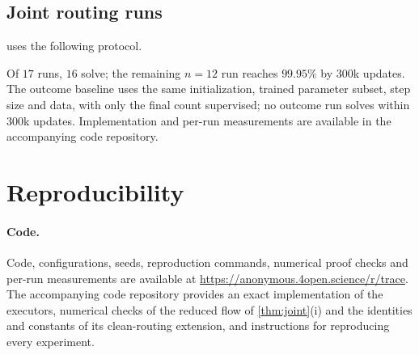 \subsection{Joint routing runs}
\label{app:reach}

 uses the following protocol.
\begin{center}\small
{}
\end{center}
Of $17$ runs, $16$ solve; the remaining $n=12$ run reaches $99.95\%$ by $300$k updates. The outcome baseline uses the same
initialization, trained parameter subset, step size and data, with only the final count supervised; no outcome run
solves within $300$k updates. Implementation and per-run measurements are available in the accompanying code repository.

\section{Reproducibility}
\label{app:reproducibility}

\paragraph{Code.} Code, configurations, seeds, reproduction commands, numerical proof checks and per-run measurements are available at
\url{https://anonymous.4open.science/r/trace}. The accompanying code repository provides an exact implementation of the executors,
numerical checks of the reduced flow of \cref{thm:joint}(i) and the identities and constants of its clean-routing extension, and instructions for reproducing every experiment.

